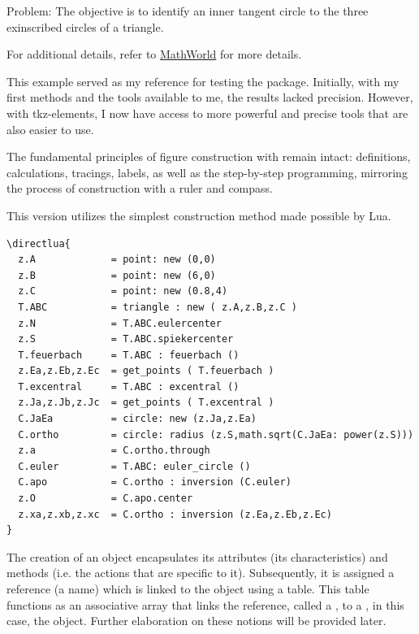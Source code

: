 \begin{mybox}{Problem:}
The objective is to identify an inner tangent circle to the three exinscribed circles of a triangle.\end{mybox}

 For additional details, refer to \href{https://mathworld.wolfram.com/ApolloniusCircle.html}{MathWorld} for more details.

This example served as my reference for testing the  package. Initially, with my first methods and the tools available to me, the results lacked precision.  However, with tkz-elements, I now have access to more powerful and precise tools that are also easier to use.

The fundamental principles of figure construction with  remain intact: definitions, calculations, tracings, labels, as well as the  step-by-step programming, mirroring the process of construction with a ruler and compass. 

This version utilizes the simplest construction method made possible by Lua.

\begin{mybox}
\begin{Verbatim}
\directlua{
  z.A             = point: new (0,0)
  z.B             = point: new (6,0)
  z.C             = point: new (0.8,4)
  T.ABC           = triangle : new ( z.A,z.B,z.C )
  z.N             = T.ABC.eulercenter
  z.S             = T.ABC.spiekercenter
  T.feuerbach     = T.ABC : feuerbach ()
  z.Ea,z.Eb,z.Ec  = get_points ( T.feuerbach )
  T.excentral     = T.ABC : excentral ()
  z.Ja,z.Jb,z.Jc  = get_points ( T.excentral )
  C.JaEa          = circle: new (z.Ja,z.Ea)
  C.ortho         = circle: radius (z.S,math.sqrt(C.JaEa: power(z.S)))
  z.a             = C.ortho.through
  C.euler         = T.ABC: euler_circle ()
  C.apo           = C.ortho : inversion (C.euler)
  z.O             = C.apo.center
  z.xa,z.xb,z.xc  = C.ortho : inversion (z.Ea,z.Eb,z.Ec)
}
\end{Verbatim}
\end{mybox}

The creation of an object encapsulates its attributes (its characteristics) and methods (i.e. the actions that are specific to it). Subsequently, it is assigned a reference (a name) which is linked to the object using a table. This table functions as an associative array that links the reference, called a , to a , in this case, the object. Further elaboration on these notions will be provided later.

